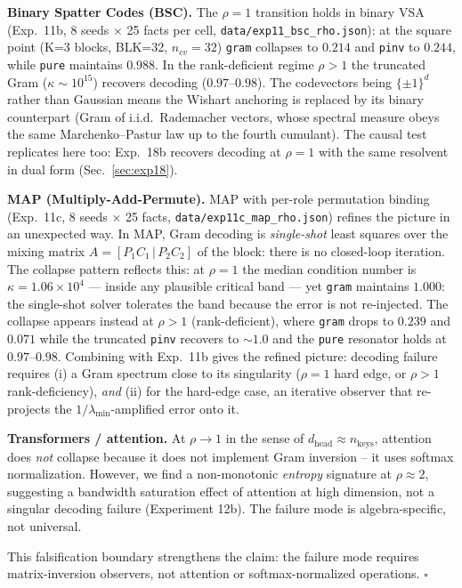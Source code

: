 \documentclass[11pt,a4paper]{article}
\begin{document}
\textbf{Binary Spatter Codes (BSC).} The $\rho=1$ transition holds in binary VSA (Exp.~11b, 8 seeds $\times$ 25 facts per cell, \texttt{data/exp11\_bsc\_rho.json}): at the square point (K=3 blocks, BLK=32, $n_{cv}=32$) \texttt{gram} collapses to $0.214$ and \texttt{pinv} to $0.244$, while \texttt{pure} maintains $0.988$. In the rank-deficient regime $\rho>1$ the truncated Gram ($\kappa \sim 10^{15}$) recovers decoding ($0.97$--$0.98$). The codevectors being $\{\pm1\}^{d}$ rather than Gaussian means the Wishart anchoring is replaced by its binary counterpart (Gram of i.i.d.\ Rademacher vectors, whose spectral measure obeys the same Marchenko--Pastur law up to the fourth cumulant). The causal test replicates here too: Exp.~18b recovers decoding at $\rho=1$ with the same resolvent in dual form (Sec.~\ref{sec:exp18}).

\textbf{MAP (Multiply-Add-Permute).} MAP with per-role permutation binding (Exp.~11c, 8 seeds $\times$ 25 facts, \texttt{data/exp11c\_map\_rho.json}) refines the picture in an unexpected way. In MAP, Gram decoding is \emph{single-shot} least squares over the mixing matrix $A = [P_1 C_1 \,|\, P_2 C_2]$ of the block: there is no closed-loop iteration. The collapse pattern reflects this: at $\rho = 1$ the median condition number is $\kappa = 1.06\times 10^{4}$ --- inside any plausible critical band --- yet \texttt{gram} maintains $1.000$: the single-shot solver tolerates the band because the error is not re-injected. The collapse appears instead at $\rho > 1$ (rank-deficient), where \texttt{gram} drops to $0.239$ and $0.071$ while the truncated \texttt{pinv} recovers to $\sim 1.0$ and the \texttt{pure} resonator holds at $0.97$--$0.98$. Combining with Exp.~11b gives the refined picture: decoding failure requires (i) a Gram spectrum close to its singularity ($\rho=1$ hard edge, or $\rho>1$ rank-deficiency), \emph{and} (ii) for the hard-edge case, an iterative observer that re-projects the $1/\lambda_{\min}$-amplified error onto it.

\textbf{Transformers / attention.} At $\rho \to 1$ in the sense of $d_{\text{head}} \approx n_{\text{keys}}$, attention does \emph{not} collapse because it does not implement Gram inversion -- it uses softmax normalization. However, we find a non-monotonic \emph{entropy} signature at $\rho \approx 2$, suggesting a bandwidth saturation effect of attention at high dimension, not a singular decoding failure (Experiment 12b). The failure mode is algebra-specific, not universal.

This falsification boundary strengthens the claim: the failure mode requires matrix-inversion observers, not attention or softmax-normalized operations. $\square$
\end{document}
